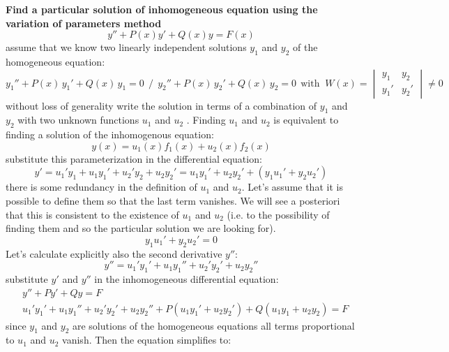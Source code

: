 \documentclass{article}
\begin{document}
\vspace{3mm}\noindent
\textbf{Find a particular solution of inhomogeneous equation using the variation of parameters method}
\begin{equation}
    y'' + P(x) y' + Q(x) y = F(x)
\end{equation}
assume that we know two linearly independent solutions $y_1$ and $y_2$ of the homogeneous equation:
\begin{equation}
    y_1'' + P(x)\, y_1' + Q(x)\, y_1 = 0 \ \ / \ \ y_2'' + P(x)\, y_2' + Q(x)\, y_2 = 0 \ \ \text{with }\ W(x) = 
\begin{vmatrix}
y_1 & y_2 \\
y_1' & y_2'
\end{vmatrix}
\neq 0
\end{equation}
without loss of generality write the solution in terms of a combination of $y_1$ and $y_2$ with two unknown functions $u_1$ and $u_2$ . Finding $u_1$ and $u_2$ is equivalent to finding a solution of the inhomogenous equation:
\begin{equation}
    y(x) = u_1(x) f_1(x) + u_2(x) f_2(x)
\end{equation}
substitute this parameterization in the differential equation:
\begin{equation}
    y' = u_1' y_1 + u_1 y_1' + u_2' y_2 + u_2 y_2' 
= u_1 y_1' + u_2 y_2' + \left( y_1 u_1' + y_2 u_2' \right)
\end{equation}
there is some redundancy in the definition of $u_1$ and $u_2$. Let’s assume that it is possible to define them so that the last term vanishes. We will see a posteriori that this is consistent to the existence of $u_1$ and $u_2$ (i.e. to the possibility of finding them and so the particular solution we are looking for).
\begin{equation}
    y_1 u_1' + y_2 u_2' = 0
\end{equation}
Let’s calculate explicitly also the second derivative $y''$:
\begin{equation}
    y'' = u_1' y_1' + u_1 y_1'' + u_2' y_2' + u_2 y_2''
\end{equation}
substitute $y'$ and $y''$ in the inhomogeneous differential equation:
\begin{align}
    &y'' + P y' + Q y = F \\ &u_1' y_1' + u_1 y_1'' + u_2' y_2' + u_2 y_2'' + P \left(u_1 y_1' + u_2 y_2'\right) + Q \left(u_1 y_1 + u_2 y_2\right) = F
\end{align}
since $y_1$ and $y_2$ are solutions of the homogeneous equations all terms proportional to $u_1$ and $u_2$ vanish. Then the equation simplifies to:
\end{document}
